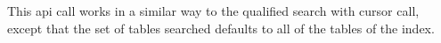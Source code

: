 This api call works in a similar way to the qualified search with cursor call, except that
the set of tables searched defaults to all of the tables of the index.
